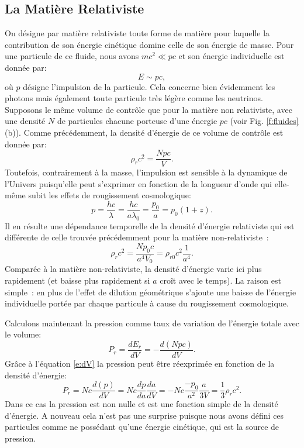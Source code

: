 \subsection{La Matière Relativiste}
On désigne par matière relativiste toute forme de matière pour laquelle la contribution de son énergie cinétique domine celle de son énergie de masse. Pour une particule de ce fluide, nous avons $mc^2\ll pc$ et son énergie individuelle est donnée par:
\begin{equation}
E\sim pc,
\end{equation}
où $p$ désigne l'impulsion de la particule. Cela concerne bien évidemment les photons mais également toute particule très légère comme les neutrinos. Supposons le même volume de contrôle que pour la matière non relativiste, avec une densité $N$ de particules chacune porteuse d'une énergie $pc$ (voir Fig. \ref{f:fluides} (b)). Comme précédemment, la densité d'énergie de ce volume de contrôle est donnée par:
\begin{equation}
\rho_rc^2=\frac{Npc}{V}.
\end{equation}
Toutefois, contrairement à la masse, l'impulsion est sensible à la dynamique de l'Univers puisqu'elle peut s'exprimer en fonction de la longueur d'onde qui elle-même subit les effets de rougissement cosmologique:
\begin{equation}
p=\frac{hc}{\lambda}=\frac{hc}{a\lambda_0}=\frac{p_0}{a}=p_0(1+z).
\end{equation}
Il en résulte une dépendance temporelle de la densité d'énergie relativiste qui est différente de celle trouvée précédemment pour la matière non-relativiste~:
\begin{equation}
\rho_rc^2=\frac{Np_0c}{ a^4 V_0}=\rho_{r0}c^2\frac{1}{a^4}.
\end{equation}
Comparée à la matière non-relativiste, la densité d'énergie varie ici plus rapidement (et baisse plus rapidement si $a$ croît avec le temps). La raison est simple~: en plus de l'effet de dilution géométrique s'ajoute une baisse de l'énergie individuelle portée par chaque particule à cause du rougissement cosmologique.

Calculons maintenant la pression  comme taux de variation de l'énergie totale avec le volume:
\begin{equation}
P_r=\frac{dE_r}{dV}=-\frac{d(Npc)}{dV}.
\end{equation}
Grâce à l'équation \ref{e:dV} la pression peut être réexprimée en fonction de la densité d'énergie:
\begin{equation}
P_r=Nc\frac{d(p)}{dV}=Nc\frac{dp}{da}\frac{da}{dV}=-Nc\frac{-p_0}{a^2}\frac{a}{3V}=\frac{1}{3}\rho_rc^2.
\end{equation}
Dans ce cas la pression est non nulle et est une fonction simple de la densité d'énergie. A nouveau cela n'est pas une surprise puisque nous avons défini ces particules comme ne possédant qu'une énergie cinétique, qui est la source de pression.

